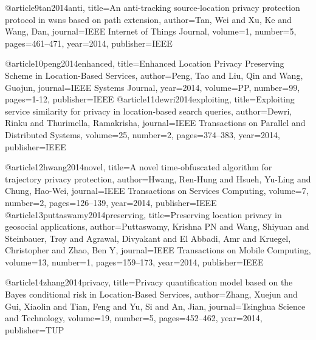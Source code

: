 {{{{@article{9tan2014anti,
	title={An anti-tracking source-location privacy protection protocol in wsns based on path extension},
	author={Tan, Wei and Xu, Ke and Wang, Dan},
	journal={IEEE Internet of Things Journal},
	volume={1},
	number={5},
	pages={461--471},
	year={2014},
	publisher={IEEE}
}

@article{10peng2014enhanced,
	title={Enhanced Location Privacy Preserving Scheme in Location-Based Services},
	author={Peng, Tao and Liu, Qin and Wang, Guojun},
	journal={IEEE Systems Journal},
	year={2014},
	volume={PP},
	number={99},
	pages={1-12},
	publisher={IEEE}
}
@article{11dewri2014exploiting,
	title={Exploiting service similarity for privacy in location-based search queries},
	author={Dewri, Rinku and Thurimella, Ramakrisha},
	journal={IEEE Transactions on Parallel and Distributed Systems},
	volume={25},
	number={2},
	pages={374--383},
	year={2014},
	publisher={IEEE}
}

@article{12hwang2014novel,
	title={A novel time-obfuscated algorithm for trajectory privacy protection},
	author={Hwang, Ren-Hung and Hsueh, Yu-Ling and Chung, Hao-Wei},
	journal={IEEE Transactions on Services Computing},
	volume={7},
	number={2},
	pages={126--139},
	year={2014},
	publisher={IEEE}
}
@article{13puttaswamy2014preserving,
	title={Preserving location privacy in geosocial applications},
	author={Puttaswamy, Krishna PN and Wang, Shiyuan and Steinbauer, Troy and Agrawal, Divyakant and El Abbadi, Amr and Kruegel, Christopher and Zhao, Ben Y},
	journal={IEEE Transactions on Mobile Computing},
	volume={13},
	number={1},
	pages={159--173},
	year={2014},
	publisher={IEEE}
}

@article{14zhang2014privacy,
	title={Privacy quantification model based on the Bayes conditional risk in Location-Based Services},
	author={Zhang, Xuejun and Gui, Xiaolin and Tian, Feng and Yu, Si and An, Jian},
	journal={Tsinghua Science and Technology},
	volume={19},
	number={5},
	pages={452--462},
	year={2014},
	publisher={TUP}
}

}}}}
